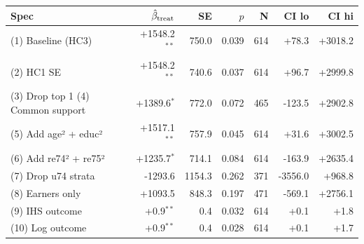 \begin{tabular}{lrrrrrr}
\toprule
Spec & $\hat\beta_{\rm treat}$ & SE & $p$ & N & CI lo & CI hi \\
\midrule
(1) Baseline (HC3)       &  +1548.2$^{**}$ &  750.0 & 0.039 & 614 &    +78.3 &  +3018.2 \\
(2) HC1 SE               &  +1548.2$^{**}$ &  740.6 & 0.037 & 614 &    +96.7 &  +2999.8 \\
(3) Drop top 1%
(4) Common support       &  +1389.6$^{*}$ &  772.0 & 0.072 & 465 &   -123.5 &  +2902.8 \\
(5) Add age² + educ²     &  +1517.1$^{**}$ &  757.9 & 0.045 & 614 &    +31.6 &  +3002.5 \\
(6) Add re74² + re75²    &  +1235.7$^{*}$ &  714.1 & 0.084 & 614 &   -163.9 &  +2635.4 \\
(7) Drop u74 strata      &  -1293.6 & 1154.3 & 0.262 & 371 &  -3556.0 &   +968.8 \\
(8) Earners only         &  +1093.5 &  848.3 & 0.197 & 471 &   -569.1 &  +2756.1 \\
(9) IHS outcome          &     +0.9$^{**}$ &    0.4 & 0.032 & 614 &     +0.1 &     +1.8 \\
(10) Log outcome         &     +0.9$^{**}$ &    0.4 & 0.028 & 614 &     +0.1 &     +1.7 \\
\bottomrule
\end{tabular}
